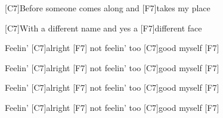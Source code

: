 \documentclass[12pt]{article}
\begin{document}
\vspace{0.00mm}
\setlength{\parindent}{0.00mm}
\setlength{\leftskip}{-6.25mm}
\setlength{\rightskip}{0.00mm}
\raggedright
[C7]Before someone comes along and [F7]takes my place
\vspace{0.00mm}

\vspace{0.00mm}
\setlength{\parindent}{0.00mm}
\setlength{\leftskip}{-6.25mm}
\setlength{\rightskip}{0.00mm}
\raggedright
[C7]With a different name and yes a [F7]different face
\vspace{0.00mm}

\vspace{0.00mm}
\setlength{\parindent}{0.00mm}
\setlength{\leftskip}{-6.25mm}
\setlength{\rightskip}{0.00mm}
\raggedright

\vspace{0.00mm}

\vspace{0.00mm}
\setlength{\parindent}{0.00mm}
\setlength{\leftskip}{-6.25mm}
\setlength{\rightskip}{0.00mm}
\raggedright
Feelin' [C7]alright   [F7]  not feelin' too [C7]good myself  [F7]  
\vspace{0.00mm}

\vspace{0.00mm}
\setlength{\parindent}{0.00mm}
\setlength{\leftskip}{-5.94mm}
\setlength{\rightskip}{0.00mm}
\raggedright
Feelin' [C7]alright   [F7]  not feelin' too [C7]good myself  [F7]  
\vspace{0.00mm}

\vspace{0.00mm}
\setlength{\parindent}{0.00mm}
\setlength{\leftskip}{-5.94mm}
\setlength{\rightskip}{0.00mm}
\raggedright
Feelin' [C7]alright   [F7]  not feelin' too [C7]good myself  [F7]  
\vspace{0.00mm}

\vspace{0.00mm}
\setlength{\parindent}{0.00mm}
\setlength{\leftskip}{-5.94mm}
\setlength{\rightskip}{0.00mm}
\raggedright
Feelin' [C7]alright   [F7]  not feelin' too [C7]good myself  [F7] 
\vspace{0.00mm}
\end{document}
